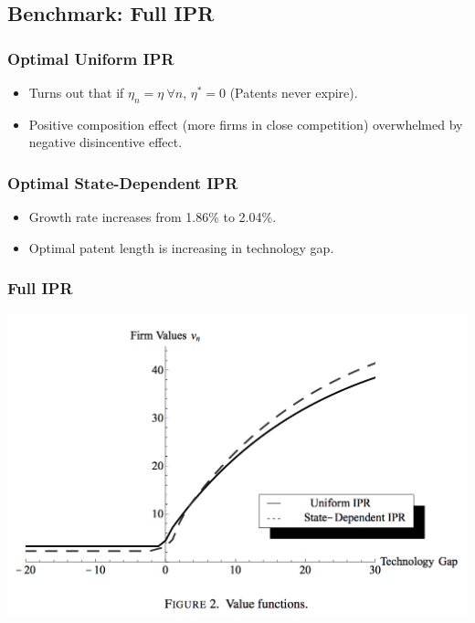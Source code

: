 \documentclass{beamer}
\begin{document}
\subsection{Benchmark: Full IPR}
\label{sub:benchmark_full_ipr}
\begin{frame}[t]\frametitle{Optimal Uniform IPR} 
  \begin{itemize}
    \item<+-> Turns out that if $\eta_n = \eta \ \forall n$, $\eta^* = 0$ (Patents never expire).
    \item<+-> Positive composition effect (more firms in close competition) overwhelmed by negative disincentive effect.
  \end{itemize}
\end{frame}

\begin{frame}[t]\frametitle{Optimal State-Dependent IPR} 
  \begin{itemize}
    \item<+-> Growth rate increases from 1.86\% to 2.04\%.
    \item<+-> Optimal patent length is increasing in technology gap. 
  \end{itemize}
\end{frame}

\begin{frame}[t]\frametitle{Full IPR} 
  \begin{center}
    \includegraphics[scale=.31]{full_ipr_value.png}
    \label{fig:full_ipr_value}
  \end{center}
\end{frame}
\end{document}
